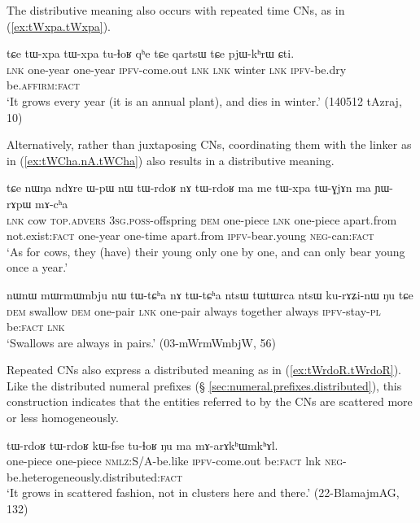 The distributive meaning also occurs with repeated time CNs, as in (\ref{ex:tWxpa.tWxpa}).

\begin{exe}
\ex \label{ex:tWxpa.tWxpa}
\gll tɕe tɯ-xpa tɯ-xpa tu-ɬoʁ qʰe tɕe qartsɯ tɕe pjɯ-kʰrɯ ɕti. \\
 \textsc{lnk} one-year one-year \textsc{ipfv}-come.out \textsc{lnk} \textsc{lnk} winter \textsc{lnk}  \textsc{ipfv}-be.dry be.\textsc{affirm}:\textsc{fact} \\
\glt  `It grows every year (it is an annual plant), and dies in winter.' (140512 tAzraj, 10)
\end{exe}

Alternatively, rather than juxtaposing CNs, coordinating them with the linker  as in (\ref{ex:tWCha.nA.tWCha}) also results in a distributive meaning.

\begin{exe}
\ex \label{ex:tWrdoʁ.nA.tWrdoʁ}
\gll  tɕe nɯŋa ndɤre ɯ-pɯ nɯ tɯ-rdoʁ nɤ tɯ-rdoʁ ma me tɯ-xpa tɯ-ɣjɤn ma ɲɯ-rɤpɯ mɤ-cʰa \\
 \textsc{lnk} cow \textsc{top.advers} \textsc{3sg}.\textsc{poss}-offspring \textsc{dem} one-piece \textsc{lnk} one-piece apart.from not.exist:\textsc{fact}  one-year one-time apart.from \textsc{ipfv}-bear.young \textsc{neg}-can:\textsc{fact} \\
\glt `As for cows, they (have) their young only one by one, and can only bear young once a year.'
\end{exe}

\begin{exe}
\ex \label{ex:tWCha.nA.tWCha}
\gll nɯnɯ mɯrmɯmbju nɯ tɯ-tɕʰa nɤ tɯ-tɕʰa ntsɯ tɯtɯrca ntsɯ ku-rɤʑi-nɯ ŋu tɕe \\
 \textsc{dem} swallow \textsc{dem} one-pair \textsc{lnk}  one-pair  always together always \textsc{ipfv}-stay-\textsc{pl} be:\textsc{fact} \textsc{lnk}  \\
\glt `Swallows are always in pairs.' (03-mWrmWmbjW, 56)
\end{exe}

Repeated CNs also express a distributed meaning as in (\ref{ex:tWrdoR.tWrdoR}). Like the distributed numeral prefixes (§ \ref{sec:numeral.prefixes.distributed}), this construction indicates that the entities referred to by the CNs are scattered more or less homogeneously.

\begin{exe}
\ex \label{ex:tWrdoR.tWrdoR}
\gll  tɯ-rdoʁ tɯ-rdoʁ kɯ-fse tu-ɬoʁ ŋu ma mɤ-arɤkʰɯmkʰɤl. \\
 one-piece one-piece \textsc{nmlz}:S/A-be.like \textsc{ipfv}-come.out  be:\textsc{fact} lnk \textsc{neg}-be.heterogeneously.distributed:\textsc{fact} \\
\glt `It grows in scattered fashion, not in clusters here and there.' (22-BlamajmAG, 132)
\end{exe}

